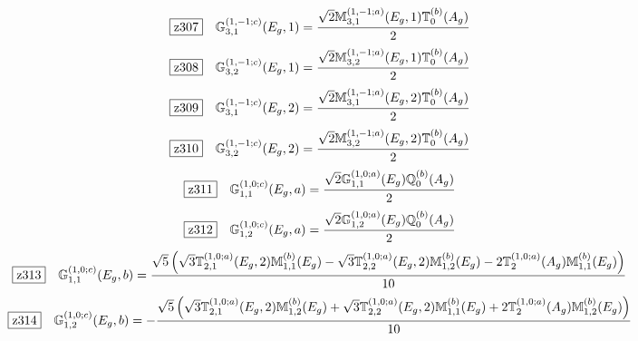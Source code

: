 \documentclass[fleqn,10pt,landscape]{jsarticle}
\begin{document}
\begin{dmath*}
\hspace*{3mm}\fbox{z307}\quad \mathbb{G}_{3,1}^{(1,-1;c)}(E_{g},1)=\frac{\sqrt{2} \mathbb{M}_{3,1}^{(1,-1;a)}(E_{g},1) \mathbb{T}_{0}^{(b)}(A_{g})}{2}
\end{dmath*}
\begin{dmath*}
\hspace*{3mm}\fbox{z308}\quad \mathbb{G}_{3,2}^{(1,-1;c)}(E_{g},1)=\frac{\sqrt{2} \mathbb{M}_{3,2}^{(1,-1;a)}(E_{g},1) \mathbb{T}_{0}^{(b)}(A_{g})}{2}
\end{dmath*}
\begin{dmath*}
\hspace*{3mm}\fbox{z309}\quad \mathbb{G}_{3,1}^{(1,-1;c)}(E_{g},2)=\frac{\sqrt{2} \mathbb{M}_{3,1}^{(1,-1;a)}(E_{g},2) \mathbb{T}_{0}^{(b)}(A_{g})}{2}
\end{dmath*}
\begin{dmath*}
\hspace*{3mm}\fbox{z310}\quad \mathbb{G}_{3,2}^{(1,-1;c)}(E_{g},2)=\frac{\sqrt{2} \mathbb{M}_{3,2}^{(1,-1;a)}(E_{g},2) \mathbb{T}_{0}^{(b)}(A_{g})}{2}
\end{dmath*}
\begin{dmath*}
\hspace*{3mm}\fbox{z311}\quad \mathbb{G}_{1,1}^{(1,0;c)}(E_{g},a)=\frac{\sqrt{2} \mathbb{G}_{1,1}^{(1,0;a)}(E_{g}) \mathbb{Q}_{0}^{(b)}(A_{g})}{2}
\end{dmath*}
\begin{dmath*}
\hspace*{3mm}\fbox{z312}\quad \mathbb{G}_{1,2}^{(1,0;c)}(E_{g},a)=\frac{\sqrt{2} \mathbb{G}_{1,2}^{(1,0;a)}(E_{g}) \mathbb{Q}_{0}^{(b)}(A_{g})}{2}
\end{dmath*}
\begin{dmath*}
\hspace*{3mm}\fbox{z313}\quad \mathbb{G}_{1,1}^{(1,0;c)}(E_{g},b)=\frac{\sqrt{5} \left(\sqrt{3} \mathbb{T}_{2,1}^{(1,0;a)}(E_{g},2) \mathbb{M}_{1,1}^{(b)}(E_{g}) - \sqrt{3} \mathbb{T}_{2,2}^{(1,0;a)}(E_{g},2) \mathbb{M}_{1,2}^{(b)}(E_{g}) - 2 \mathbb{T}_{2}^{(1,0;a)}(A_{g}) \mathbb{M}_{1,1}^{(b)}(E_{g})\right)}{10}
\end{dmath*}
\begin{dmath*}
\hspace*{3mm}\fbox{z314}\quad \mathbb{G}_{1,2}^{(1,0;c)}(E_{g},b)=- \frac{\sqrt{5} \left(\sqrt{3} \mathbb{T}_{2,1}^{(1,0;a)}(E_{g},2) \mathbb{M}_{1,2}^{(b)}(E_{g}) + \sqrt{3} \mathbb{T}_{2,2}^{(1,0;a)}(E_{g},2) \mathbb{M}_{1,1}^{(b)}(E_{g}) + 2 \mathbb{T}_{2}^{(1,0;a)}(A_{g}) \mathbb{M}_{1,2}^{(b)}(E_{g})\right)}{10}
\end{dmath*}
\end{document}
